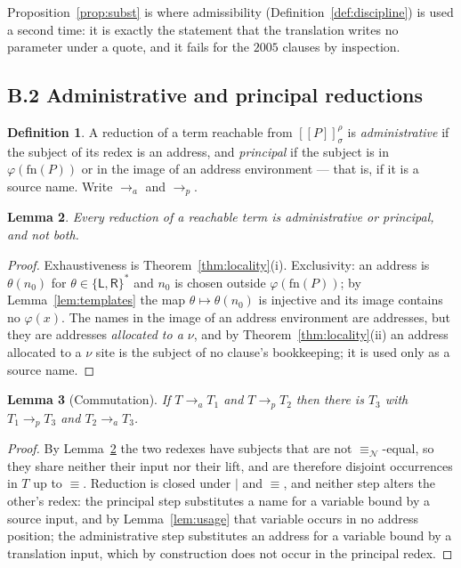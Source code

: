 \documentclass[11pt]{article}
\theoremstyle{definition}
\newtheorem{definition}{Definition}[section]
\theoremstyle{plain}
\newtheorem{lemma}[definition]{Lemma}
\theoremstyle{remark}
\newcommand{\enc}[1]{[\![#1]\!]}
\newcommand{\nequiv}{\equiv_{\mathcal{N}}}
\newcommand{\Lft}{\mathsf{L}}
\newcommand{\Rgt}{\mathsf{R}}
\newcommand{\fn}{\mathrm{fn}}
\begin{document}
Proposition~\ref{prop:subst} is where admissibility
(Definition~\ref{def:discipline}) is used a second time: it is exactly the
statement that the translation writes no parameter under a quote, and it
fails for the $2005$ clauses by inspection.

\subsection{B.2 Administrative and principal reductions}

\begin{definition}\label{def:phases}
A reduction of a term reachable from $\enc{P}^\rho_{\sigma}$ is
\emph{administrative} if the subject of its redex is an address, and
\emph{principal} if the subject is in $\varphi(\fn(P))$ or in the image of
an address environment --- that is, if it is a source name. Write
$\to_a$ and $\to_p$.
\end{definition}

\begin{lemma}\label{lem:exhaustive}
Every reduction of a reachable term is administrative or principal, and
not both.
\end{lemma}

\begin{proof}
Exhaustiveness is Theorem~\ref{thm:locality}(i). Exclusivity: an address
is $\theta(n_0)$ for $\theta \in \{\Lft,\Rgt\}^*$ and $n_0$ is chosen
outside $\varphi(\fn(P))$; by Lemma~\ref{lem:templates} the map
$\theta \mapsto \theta(n_0)$ is injective and its image contains no
$\varphi(x)$. The names in the image of an address environment are
addresses, but they are addresses \emph{allocated to a $\nu$}, and by
Theorem~\ref{thm:locality}(ii) an address allocated to a $\nu$ site is the
subject of no clause's bookkeeping; it is used only as a source name.
\end{proof}

\begin{lemma}[Commutation]\label{lem:commute}
If $T \to_a T_1$ and $T \to_p T_2$ then there is $T_3$ with
$T_1 \to_p T_3$ and $T_2 \to_a T_3$.
\end{lemma}

\begin{proof}
By Lemma~\ref{lem:exhaustive} the two redexes have subjects that are not
$\nequiv$-equal, so they share neither their input nor their lift, and are
therefore disjoint occurrences in $T$ up to $\equiv$. Reduction is closed
under $\mid$ and $\equiv$, and neither step alters the other's redex:
the principal step substitutes a name for a variable bound by a source
input, and by Lemma~\ref{lem:usage} that variable occurs in no address
position; the administrative step substitutes an address for a variable
bound by a translation input, which by construction does not occur in the
principal redex.
\end{proof}
\end{document}
